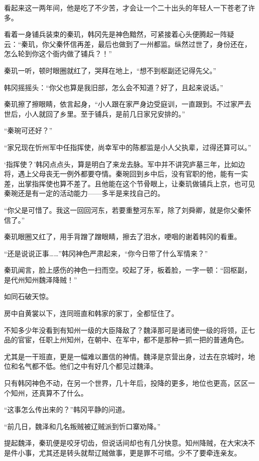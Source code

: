 看起来这一两年间，他是吃了不少苦，才会让一个二十出头的年轻人一下苍老了许多。 

看着一身铺兵装束的秦玑，韩冈先是神色黯然，可紧接着心头便腾起一阵疑云：“秦玑，你父秦怀信再差，最后也做到了一州都监。纵然过世了，身份还在，怎么轮到你这个衙内做了铺兵？！” 

秦玑一听，顿时眼圈就红了，哭拜在地上，“想不到枢副还记得先父。” 

韩冈摇摇头：“你父也算是我旧部，怎么会不知道？好了，且起来说话。” 

秦玑擦了擦眼睛，依言起身，“小人跟在家严身边受庭训，一直跟到。不过家严去世后，小人就回了乡里。至于铺兵，是前几日家兄安排的。” 

“秦琬可还好？” 

“家兄现在忻州军中任指挥使，尚幸军中的陈都监是小人父执辈，过得还算可以。” 

‘指挥使？’韩冈点点头，算是明白了来龙去脉。军中并不讲究庐墓三年，比如边将，遇上父母丧无一例外都要夺情。秦琬回到乡中后，没有官职的他，能有一实差，出掌指挥使也算不差了。且他能在这个节骨眼上，让秦玑做铺兵上京，也可见秦琬还是有一定的活动能力——多半是来找自己的。 

“你父是可惜了。我这一回回河东，若要重整河东军，除了刘舜卿，就是你父秦怀信了。” 

秦玑眼圈又红了，用手背蹭了蹭眼睛，擦去了泪水，哽咽的谢着韩冈的看重。 

“还是说说正事……”韩冈神色严肃起来，“你今日带了什么军情来？” 

秦玑闻言，脸上感伤的神色一扫而空。咬起了牙，板着脸，一字一顿：“回枢副，是代州知州魏泽降贼！” 

如同石破天惊。 

房中自黄裳以下，连同班直和韩家的家丁，全都怔住了。 

不知多少年没看到有知州一级的大臣降敌了？魏泽那可是诸司使一级的将领，正七品的官宦，任职上州知州，在朝中、在军中，都不是那种一抓一把的普通角色。 

尤其是一干班直，更是一幅难以置信的神情。魏泽是京营出身，过去在京城时，地位和名气都不低。他们之中有好几个都见过魏泽。 

只有韩冈神色不动，在另一个世界，几十年后，投降的更多，地位也更高，区区一个知州，还真算不了什么。 

“这事怎么传出来的？”韩冈平静的问道。 

“前几日，魏泽和几名叛贼被辽贼派到忻口寨劝降。” 

提起魏泽，秦玑便是咬牙切齿，但说话间却也有几分快意。知州降贼，在大宋决不是件小事，尤其还是转头就帮辽贼做事，更是罪不可绾。少不了要牵连亲友。 

